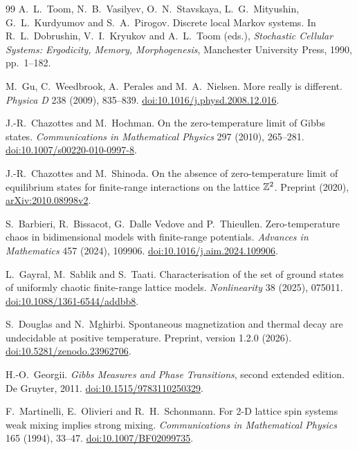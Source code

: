 \begin{thebibliography}{99}
 A.~L.~Toom, N.~B.~Vasilyev, O.~N.~Stavskaya, L.~G.~Mityushin,
G.~L.~Kurdyumov and S.~A.~Pirogov.
Discrete local Markov systems.
In R.~L.~Dobrushin, V.~I.~Kryukov and A.~L.~Toom (eds.),
\emph{Stochastic Cellular Systems: Ergodicity, Memory, Morphogenesis},
Manchester University Press, 1990, pp.~1--182.

 M.~Gu, C.~Weedbrook, A.~Perales and M.~A.~Nielsen.
More really is different.
\emph{Physica D} 238 (2009), 835--839.
\href{https://doi.org/10.1016/j.physd.2008.12.016}{doi:10.1016/j.physd.2008.12.016}.

 J.-R.~Chazottes and M.~Hochman.
On the zero-temperature limit of Gibbs states.
\emph{Communications in Mathematical Physics} 297 (2010), 265--281.
\href{https://doi.org/10.1007/s00220-010-0997-8}{doi:10.1007/s00220-010-0997-8}.

 J.-R.~Chazottes and M.~Shinoda.
On the absence of zero-temperature limit of equilibrium states for finite-range interactions on the lattice \(\mathbb Z^2\).
Preprint (2020), \href{https://arxiv.org/abs/2010.08998v2}{arXiv:2010.08998v2}.

 S.~Barbieri, R.~Bissacot, G.~Dalle Vedove and P.~Thieullen.
Zero-temperature chaos in bidimensional models with finite-range potentials.
\emph{Advances in Mathematics} 457 (2024), 109906.
\href{https://doi.org/10.1016/j.aim.2024.109906}{doi:10.1016/j.aim.2024.109906}.

 L.~Gayral, M.~Sablik and S.~Taati.
Characterisation of the set of ground states of uniformly chaotic finite-range lattice models.
\emph{Nonlinearity} 38 (2025), 075011.
\href{https://doi.org/10.1088/1361-6544/addbb8}{doi:10.1088/1361-6544/addbb8}.

 S.~Douglas and N.~Mghirbi.
Spontaneous magnetization and thermal decay are undecidable at positive temperature.
Preprint, version 1.2.0 (2026).
\href{https://doi.org/10.5281/zenodo.23962706}{doi:10.5281/zenodo.23962706}.

 H.-O.~Georgii.
\emph{Gibbs Measures and Phase Transitions}, second extended edition.
De Gruyter, 2011.
\href{https://doi.org/10.1515/9783110250329}{doi:10.1515/9783110250329}.


 F.~Martinelli, E.~Olivieri and R.~H.~Schonmann.
For 2-D lattice spin systems weak mixing implies strong mixing.
\emph{Communications in Mathematical Physics} 165 (1994), 33--47.
\href{https://doi.org/10.1007/BF02099735}{doi:10.1007/BF02099735}.


\end{thebibliography}
